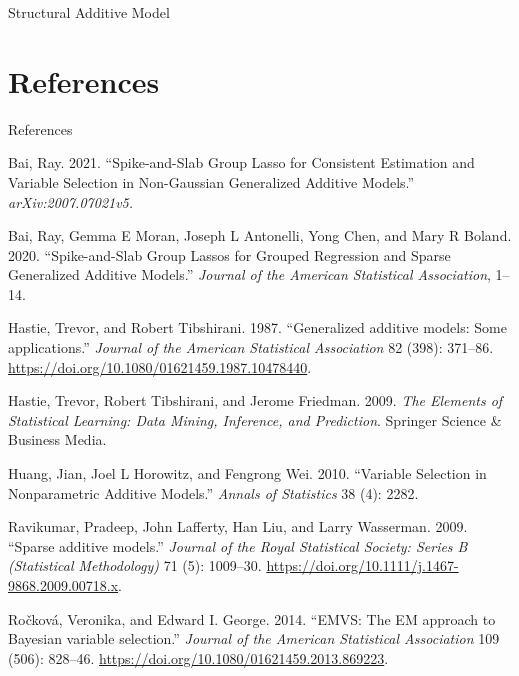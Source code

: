 \documentclass[
  ignorenonframetext,
  aspectratio=169]{beamer}
\newlength{\cslhangindent}
\newlength{\cslentryspacingunit} %
\newenvironment{CSLReferences}[2] %
 {%
  \setlength{\parindent}{0pt}
  \ifodd #1
  \let\oldpar\par
  \def\par{\hangindent=\cslhangindent\oldpar}
  \fi
  \setlength{\parskip}{#2\cslentryspacingunit}
 }%
 {}
\begin{document}
\begin{frame}{Structural Additive Model}
\protect\hypertarget{structural-additive-model}{}
\end{frame}

\hypertarget{references}{%
\section*{References}\label{references}}

\begin{frame}[allowframebreaks]{References}
\hypertarget{refs}{}
\begin{CSLReferences}{1}{0}
\leavevmode{}%
Bai, Ray. 2021. {``Spike-and-Slab Group Lasso for Consistent Estimation
and Variable Selection in Non-Gaussian Generalized Additive Models.''}
\emph{arXiv:2007.07021v5.}

\leavevmode{}%
Bai, Ray, Gemma E Moran, Joseph L Antonelli, Yong Chen, and Mary R
Boland. 2020. {``Spike-and-Slab Group Lassos for Grouped Regression and
Sparse Generalized Additive Models.''} \emph{Journal of the American
Statistical Association}, 1--14.

\leavevmode{}%
Hastie, Trevor, and Robert Tibshirani. 1987. {``{Generalized additive
models: Some applications}.''} \emph{Journal of the American Statistical
Association} 82 (398): 371--86.
\url{https://doi.org/10.1080/01621459.1987.10478440}.

\leavevmode{}%
Hastie, Trevor, Robert Tibshirani, and Jerome Friedman. 2009. \emph{The
Elements of Statistical Learning: Data Mining, Inference, and
Prediction}. Springer Science \& Business Media.

\leavevmode{}%
Huang, Jian, Joel L Horowitz, and Fengrong Wei. 2010. {``Variable
Selection in Nonparametric Additive Models.''} \emph{Annals of
Statistics} 38 (4): 2282.

\leavevmode{}%
Ravikumar, Pradeep, John Lafferty, Han Liu, and Larry Wasserman. 2009.
{``{Sparse additive models}.''} \emph{Journal of the Royal Statistical
Society: Series B (Statistical Methodology)} 71 (5): 1009--30.
\url{https://doi.org/10.1111/j.1467-9868.2009.00718.x}.

\leavevmode{}%
Ročková, Veronika, and Edward I. George. 2014. {``{EMVS: The EM approach
to Bayesian variable selection}.''} \emph{Journal of the American
Statistical Association} 109 (506): 828--46.
\url{https://doi.org/10.1080/01621459.2013.869223}.


\end{CSLReferences}
\end{frame}
\end{document}

